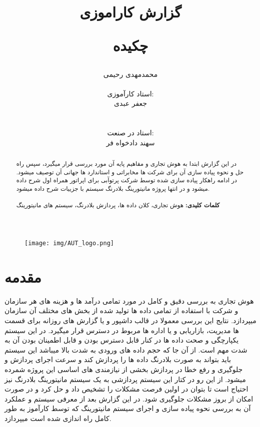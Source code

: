 \documentclass{llncs}
\begin{document}
\title{گزارش کاراموزی}
%
%

\author{محمدمهدی رحیمی \\  \\ استاد کارآموزی: \\ جعفر عبدی \\  \\ \\ استاد در صنعت: \\ سهند دادخواه فر}

\maketitle              %

\begin{figure}[h]
\centering
\texttt{[image: img/AUT\_logo.png]}
\centering
\label{fig:robot rendering}
\end{figure}
\newpage
\title{\begin{center}
\begin{normalsize}
\textbf{چکیده} 
\end{normalsize}
\end{center} }
\begin{abstract}
در این گزارش ابتدا به هوش تجاری و مفاهیم پایه آن مورد بررسی قرار میگیرد، سپس راه حل و نحوه پیاده سازی آن برای شرکت ها مخابراتی و استاندارد ها جهانی آن توصیف میشود.
در ادامه راهکار پیاده سازی شده توسط شرکت پرتوآبی برای اپراتور همراه اول شرح داده میشود و در انتها پروژه مانیتورینگ بلادرنگ سیستم با جزییات شرح داده میشود.
\\
\\
\textbf{کلمات کلیدی:} هوش تجاری، کلان داده ها، پردازش بلادرنگ، سیستم های مانیتورینگ

\end{abstract}
\newpage
%
\tableofcontents
\newpage
\listoffigures
\newpage
{}
\section{مقدمه}
هوش تجاری به بررسی دقیق و کامل در مورد تمامی درآمد ها و هزینه های هر سازمان و شرکت با استفاده از تمامی داده ها تولید شده از بخش های مختلف آن سازمان میپردازد.
نتایج این بررسی معمولا در قالب داشپور و یا گزارش های روزانه برای قسمت ها مدیریت، بازاریابی و یا اداره ها مربوط در دسترس قرار میگیرد.
در این سیستم یکپارچگی و صحت داده ها در کنار قابل دسترس بودن و قابل اطمینان بودن آن به شدت مهم است.
از آن جا که حجم داده های ورودی به شدت بالا میباشد این سیستم باید بتواند به صورت بلادرنگ داده ها را پردازش کند و سرعت اجرای پردازش و جلوگیری و رفع خطا در پردازش بخشی از نیازمندی های اساسی این پروژه شمرده میشود.
از این رو در کتار این سیستم پردازشی به یک سیستم مانیتورینگ بلادرنگ نیز احتیاج است تا بتوان در اولین فرصت مشکلات را تشخیص داد و حل کرد و در صورت امکان از بروز مشکلات جلوگیری شود.
در این گزارش بعد از معرفی سیستم و عملکرد آن به بررسی نحوه پیاده سازی و اجرای سیستم مانیتورینگ که توسط کارآموز به طور کامل راه اندازی شده است میپردازد.
\newpage
\end{document}

